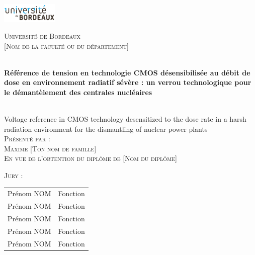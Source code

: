 \begin{titlepage}
    \begin{center}
        \begin{flushleft}
        \includegraphics[width=0.2\textwidth]{figures/universite_de_bordeaux.pdf} \\
        \vspace{1cm}
        \end{flushleft}
        \textsc{\Large Université de Bordeaux}\\[0.5cm]

        \textsc{\Large [Nom de la faculté ou du département]}\\[1.5cm]
\begin{spacing}{2}
     \HRule \\[0.4cm]
     { \huge \bfseries Référence de tension en technologie CMOS désensibilisée au débit de dose en environnement radiatif sévère : un verrou technologique pour le démantèlement des centrales nucléaires}\\[0.4cm]
     \HRule \\[1.5cm]
\end{spacing}
       

        { \large Voltage reference in CMOS technology desensitized to the dose rate in a harsh radiation environment for the dismantling of nuclear power plants}\\[1.5cm]

        \textsc{\Large Présenté par :}\\[0.4cm]
        \textsc{\large Maxime [Ton nom de famille]}\\[2cm]

        \textsc{\Large En vue de l'obtention du diplôme de [Nom du diplôme]}\\[1cm]

        \begin{flushleft}
            \textsc{Jury :}\\[0.4cm]
            \begin{tabular}{ll}
                Prénom NOM & Fonction \\
                Prénom NOM & Fonction \\
                Prénom NOM & Fonction \\
                Prénom NOM & Fonction \\
                Prénom NOM & Fonction \\
            \end{tabular}
        \end{flushleft}

 
    \end{center}
\end{titlepage}

